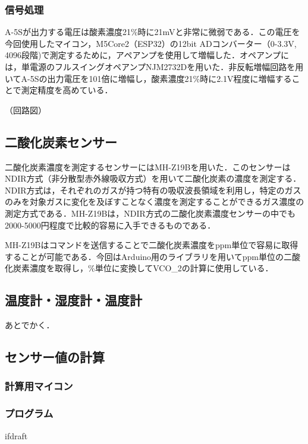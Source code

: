 \subsubsection{信号処理}

A-5Sが出力する電圧は酸素濃度21\%時に21mVと非常に微弱である．この電圧を今回使用したマイコン，M5Core2（ESP32）の12bit ADコンバーター（0-3.3V, 4096段階)で測定するために，アペアンプを使用して増幅した．オペアンプには，単電源のフルスイングオペアンプNJM2732Dを用いた．非反転増幅回路を用いてA-5Sの出力電圧を101倍に増幅し，酸素濃度21\%時に2.1V程度に増幅することで測定精度を高めている．

（回路図）

\subsection{二酸化炭素センサー}

二酸化炭素濃度を測定するセンサーにはMH-Z19Bを用いた．このセンサーはNDIR方式（非分散型赤外線吸収方式）を用いて二酸化炭素の濃度を測定する．NDIR方式は，それぞれのガスが持つ特有の吸収波長領域を利用し，特定のガスのみを対象ガスに変化を及ぼすことなく濃度を測定することができるガス濃度の測定方式である\cite{whats_ndir}．MH-Z19Bは，NDIR方式の二酸化炭素濃度センサーの中でも2000-5000円程度で比較的容易に入手できるものである．

MH-Z19Bはコマンドを送信することで二酸化炭素濃度をppm単位で容易に取得することが可能である．今回はArduino用のライブラリを用いてppm単位の二酸化炭素濃度を取得し，\%単位に変換してVCO_2の計算に使用している．

\subsection{温度計・湿度計・温度計}

あとでかく．

\subsection{センサー値の計算}

\subsubsection{計算用マイコン}

\subsubsection{プログラム}

\expandafter\ifx\csname ifdraft\endcsname\relax
  
\fi
